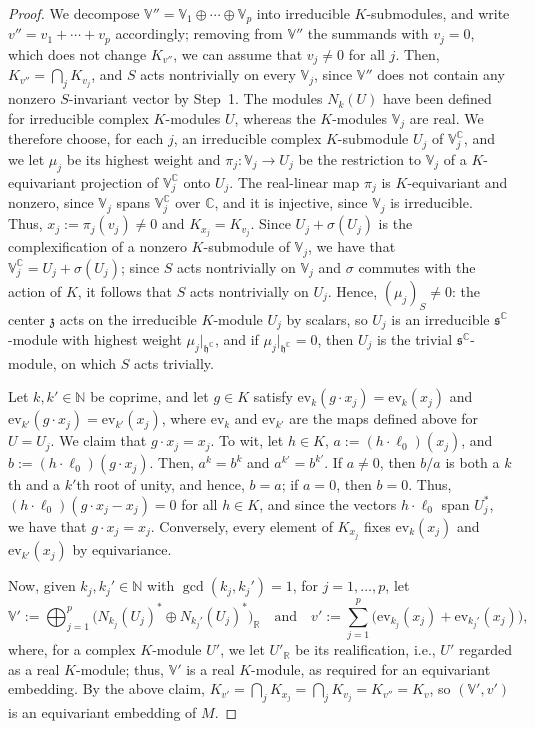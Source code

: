\documentclass{article}
\newcommand{\N}{\mathbb{N}}
\newcommand{\R}{\mathbb{R}}
\newcommand{\C}{\mathbb{C}}
\newcommand{\fraks}{\mathfrak{s}}
\newcommand{\frakz}{\mathfrak{z}}
\newcommand{\frakh}{\mathfrak{h}}
\newcommand{\xc}[1]{\vspace{.1cm}
\noindent {\em #1} }
\theoremstyle{definition}
\theoremstyle{plain}
\begin{document}
\begin{proof}
\xc{Step~2: Cartan powers.}
We decompose $\mathbb V''=\mathbb V_1\oplus\cdots\oplus\mathbb V_p$ into irreducible $K$-submodules, and write $v''=v_1+\cdots+v_p$ accordingly; removing from $\mathbb V''$ the summands with $v_j=0$, which does not change $K_{v''}$, we can assume that $v_j\neq0$ for all $j$.
Then, $K_{v''}=\bigcap_jK_{v_j}$, and $S$ acts nontrivially on every $\mathbb V_j$, since $\mathbb V''$ does not contain any nonzero $S$-invariant vector by Step~1.
The modules $N_k(U)$ have been defined for irreducible complex $K$-modules $U$, whereas the $K$-modules $\mathbb V_j$ are real.
We therefore choose, for each $j$, an irreducible complex $K$-submodule $U_j$ of $\mathbb V_j^\C$, and we let $\mu_j$ be its highest weight and $\pi_j\colon\mathbb V_j\to U_j$ be the restriction to $\mathbb V_j$ of a $K$-equivariant projection of $\mathbb V_j^\C$ onto $U_j$.
The real-linear map $\pi_j$ is $K$-equivariant and nonzero, since $\mathbb V_j$ spans $\mathbb V_j^\C$ over $\C$, and it is injective, since $\mathbb V_j$ is irreducible.
Thus, $x_j:=\pi_j(v_j)\neq0$ and $K_{x_j}=K_{v_j}$.
Since $U_j+\sigma(U_j)$ is the complexification of a nonzero $K$-submodule of $\mathbb V_j$, we have that $\mathbb V_j^\C=U_j+\sigma(U_j)$; since $S$ acts nontrivially on $\mathbb V_j$ and $\sigma$ commutes with the action of $K$, it follows that $S$ acts nontrivially on $U_j$.
Hence, $(\mu_j)_S\neq0$: the center $\frakz$ acts on the irreducible $K$-module $U_j$ by scalars, so $U_j$ is an irreducible $\fraks^\C$-module with highest weight $\mu_j|_{\frakh^\C}$, and if $\mu_j|_{\frakh^\C}=0$, then $U_j$ is the trivial $\fraks^\C$-module, on which $S$ acts trivially.

Let $k,k'\in\N$ be coprime, and let $g\in K$ satisfy $\mathrm{ev}_k(g\cdot x_j)=\mathrm{ev}_k(x_j)$ and $\mathrm{ev}_{k'}(g\cdot x_j)=\mathrm{ev}_{k'}(x_j)$,
    where $\mathrm{ev}_k$ and $\mathrm{ev}_{k'}$ are the maps defined above for $U=U_j$. We claim that $g\cdot x_j=x_j$.
To wit, let $h\in K$, $a:=(h\cdot\ell_0)(x_j)$, and $b:=(h\cdot\ell_0)(g\cdot x_j)$. Then, $a^k=b^k$ and $a^{k'}=b^{k'}$. If $a\neq0$, then $b/a$ is both a $k$th and a $k'$th root of unity, and hence, $b=a$; if $a=0$, then $b=0$.
Thus, $(h\cdot\ell_0)(g\cdot x_j-x_j)=0$ for all $h\in K$, and since the vectors $h\cdot\ell_0$ span $U_j^*$, we have that $g\cdot x_j=x_j$.
Conversely, every element of $K_{x_j}$ fixes $\mathrm{ev}_k(x_j)$ and $\mathrm{ev}_{k'}(x_j)$ by equivariance.


Now, given $k_j,k_j'\in\N$ with $\gcd(k_j,k_j')=1$, for $j=1,\ldots,p$, let
$$
  \mathbb V':=\bigoplus_{j=1}^p\bigl(N_{k_j}(U_j)^*\oplus N_{k_j'}(U_j)^*\bigr)_\R
  \quad\mbox{and}\quad
  v':=\sum_{j=1}^p\bigl(\mathrm{ev}_{k_j}(x_j)+\mathrm{ev}_{k_j'}(x_j)\bigr),
$$
 where, for a complex $K$-module $U'$, we let $U'_\R$ be its realification, i.e., $U'$ regarded as a real $K$-module; thus, $\mathbb V'$ is a real $K$-module, as required for an equivariant embedding.
By the above claim, $K_{v'}=\bigcap_jK_{x_j}=\bigcap_jK_{v_j}=K_{v''}=K_v$, so $(\mathbb V',v')$ is an equivariant embedding of $M$.


\end{proof}
\end{document}
